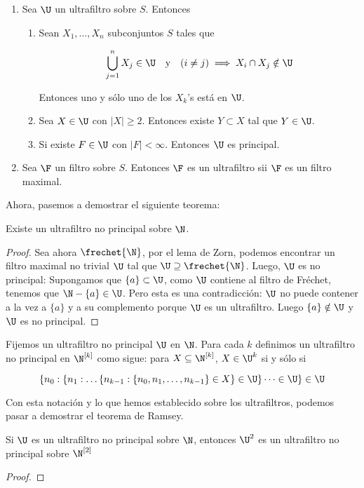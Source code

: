 \begin{enumerate}
    \item Sea $\U$ un ultrafiltro sobre $S$. Entonces
    
    \begin{enumerate}
        \item Sean $X_1, \dots, X_n$ subconjuntos $S$ tales que
        
        \[
        \bigcup_{j=1}^n X_j \in \U \quad \text{y} \quad (i \neq j) \implies X_i \cap X_j \notin \U
        \]
        
        Entonces uno y sólo uno de los $X_k$'s está en $\U$.
        
        \item Sea $X \in \U$ con $|X| \geq 2$. Entonces existe $Y \subset X$ tal que $Y \in \U$.
        
        \item Si existe $F \in \U$ con $|F| < \infty$. Entonces $\U$ es principal.
    \end{enumerate}
    
    \item Sea $\F$ un filtro sobre $S$. Entonces $\F$ es un ultrafiltro sii $\F$ es un filtro maximal.
\end{enumerate}

Ahora, pasemos a demostrar el siguiente teorema:

\begin{teo}
    Existe un ultrafiltro no principal sobre $\N$.
\end{teo}

\begin{proof}
    Sea ahora $\frechet{\N}$, por el lema de Zorn, podemos encontrar un filtro maximal no trivial $\U$ tal que $\U \supseteq \frechet{\N}$. Luego, $\U$ es no principal: Supongamos que $\{a\} \subset \U$, como $\U$ contiene al filtro de Fréchet, tenemos que $\N - \{a\} \in \U$. Pero esta es una contradicción: $\U$ no puede contener a la vez a $\{a\}$ y a su complemento porque $\U$ es un ultrafiltro. Luego $\{a\} \notin \U$ y $\U$ es no principal.
\end{proof}

\begin{notn}
    Fijemos un ultrafiltro no principal $\U$ en $\N$. Para cada $k$ definimos un ultrafiltro no principal en $\N^{[k]}$ como sigue: para $X \subseteq \N^{[k]}$, $X \in \U^k$ si y sólo si
    
    \[
    \{ n_0 : \{ n_1 : \dots \{ n_{k-1} : \{ n_0, n_1, \dots, n_{k-1} \} \in X \} \in \U \} \dots \in \U \} \in \U
    \]
\end{notn}

Con esta notación y lo que hemos establecido sobre los ultrafiltros, podemos pasar a demostrar el teorema de Ramsey.

\begin{teo}[Ramsey]
    Si $\U$ es un ultrafiltro no principal sobre $\N$, entonces $\U^2$ es un ultrafiltro no principal sobre $\N^{[2]}$
\end{teo}

\begin{proof}
    
\end{proof}